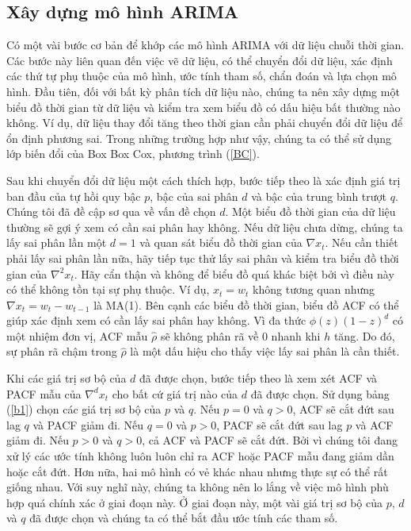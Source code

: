 \documentclass[12pt, a4paper,oneside]{book}
\theoremstyle{definition}
\begin{document}
\subsection{\label{arima}Xây dựng mô hình ARIMA}
Có một vài bước cơ bản để khớp các mô hình ARIMA với dữ liệu chuỗi thời gian. Các bước này liên quan đến việc vẽ dữ liệu, có thể chuyển đổi dữ liệu, xác định các thứ tự phụ thuộc của mô hình, ước tính tham số, chẩn đoán và lựa chọn mô hình. Đầu tiên, đối với bất kỳ phân tích dữ liệu nào, chúng ta nên xây dựng một biểu đồ thời gian từ dữ liệu và kiểm tra xem biểu đồ có dấu hiệu bất thường nào không. Ví dụ, dữ liệu thay đổi tăng theo thời gian cần phải chuyển đổi dữ liệu để ổn định phương sai. Trong những trường hợp như vậy, chúng ta có thể sử dụng lớp biến đổi của Box Box Cox, phương trình (\ref{BC}).

Sau khi chuyển đổi dữ liệu một cách thích hợp, bước tiếp theo là xác định giá trị ban đầu của tự hồi quy bậc $p$, bậc của sai phân $d$ và bậc của trung bình trượt $q$. Chúng tôi đã đề cập sơ qua về vấn đề chọn $d$. Một biểu đồ thời gian của dữ liệu thường sẽ gợi ý xem có cần sai phân hay không. Nếu dữ liệu chưa dừng, chúng ta lấy sai phân lần một $d = 1$ và quan sát biểu đồ thời gian của $\nabla x_{t}$. Nếu cần thiết phải lấy sai phân lần nữa, hãy tiếp tục thử lấy sai phân và kiểm tra biểu đồ thời gian của $\nabla^{2}x_{t}$. Hãy cẩn thận và không để biểu đồ quá khác biệt bởi vì điều này có thể không tồn tại sự phụ thuộc. Ví dụ, $x_{t}=w_{t}$ không tương quan nhưng $\nabla x_{t} = w_{t}-w_{t-1}$ là MA(1). Bên cạnh các biểu đồ thời gian, biểu đồ ACF có thể giúp xác định xem có cần lấy sai phân hay không. Vì đa thức $\phi(z)(1-z)^{d}$ có một nhiệm đơn vị, ACF mẫu $\hat{\rho}$ sẽ không phân rã về $0$ nhanh khi $h$ tăng. Do đó, sự phân rã chậm trong $\hat{\rho}$ là một dấu hiệu cho thấy việc lấy sai phân là cần thiết. 

Khi các giá trị sơ bộ của $d$ đã được chọn, bước tiếp theo là xem xét ACF và PACF mẫu của $\nabla^{d}x_{t}$ cho bất cứ giá trị nào của $d$ đã được chọn. Sử dụng bảng (\ref{b1}) chọn các giá trị sơ bộ của $p$ và $q$. Nếu $p = 0$ và $q> 0$, ACF sẽ cắt đứt sau lag $q$ và PACF giảm đi. Nếu $q = 0$ và $p> 0$, PACF sẽ cắt đứt sau lag $p$ và ACF giảm đi. Nếu $p> 0$ và $q> 0$, cả ACF và PACF sẽ cắt đứt. Bởi vì chúng tôi đang xử lý các ước tính không luôn luôn chỉ ra ACF hoặc PACF mẫu đang giảm dần hoặc cắt đứt. Hơn nữa, hai mô hình có vẻ khác nhau nhưng thực sự có thể rất giống nhau. Với suy nghĩ này, chúng ta không nên lo lắng về việc mô hình phù hợp quá chính xác ở giai đoạn này. Ở giai đoạn này, một vài giá trị sơ bộ của $p$, $d$ và $q$ đã được chọn và chúng ta có thể bắt đầu ước tính các tham số.
\end{document}
